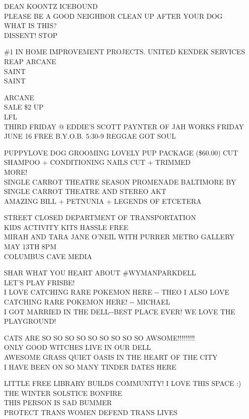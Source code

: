 \documentclass[10pt,letterpaper]{article}
\begin{document}
DEAN KOONTZ ICEBOUND\\
PLEASE BE A GOOD NEIGHBOR CLEAN UP AFTER YOUR DOG\\
WHAT IS THIS?\\
DISSENT! STOP

\#1 IN HOME IMPROVEMENT PROJECTS.  UNITED KENDEK SERVICES\\
REAP ARCANE\\
SAINT\\
SAINT

ARCANE\\
SALE \$2 UP\\
LFL\\
THIRD FRIDAY @ EDDIE'S SCOTT PAYNTER OF JAH WORKS FRIDAY JUNE 16 FREE B.Y.O.B. 5:30{-}9 REGGAE GOT SOUL

PUPPYLOVE DOG GROOMING LOVELY PUP PACKAGE (\$60.00) CUT SHAMPOO + CONDITIONING NAILS CUT + TRIMMED\\
MORE!\\
SINGLE CARROT THEATRE SEASON PROMENADE BALTIMORE BY SINGLE CARROT THEATRE AND STEREO AKT\\
AMAZING BILL + PETNUNIA + LEGENDS OF ETCETERA

STREET CLOSED DEPARTMENT OF TRANSPORTATION\\
KIDS ACTIVITY KITS HASSLE FREE\\
MIRAH AND TARA JANE O'NEIL WITH PURRER METRO GALLERY MAY 13TH 8PM\\
COLUMBUS CAVE MEDIA

SHAR WHAT YOU HEART ABOUT \#WYMANPARKDELL\\
LET'S PLAY FRISBE!\\
I LOVE CATCHING RARE POKEMON HERE {-}{-} THEO  I ALSO LOVE CATCHING RARE POKEMON HERE!  {-}{-} MICHAEL\\
I GOT MARRIED IN THE DELL{-}{-}BEST PLACE EVER!  WE LOVE THE PLAYGROUND!

CATS ARE SO SO SO SO SO SO SO SO SO AWSOME!!!!!!!!!\\
ONLY GOOD WITCHES LIVE IN OUR DELL\\
AWESOME GRASS QUIET OASIS IN THE HEART OF THE CITY\\
I HAVE BEEN ON SO MANY TINDER DATES HERE

LITTLE FREE LIBRARY BUILDS COMMUNITY!  I LOVE THIS SPACE :)\\
THE WINTER SOLSTICE BONFIRE\\
THIS PERSON IS SAD BUMMER\\
PROTECT TRANS WOMEN DEFEND TRANS LIVES
\end{document}

